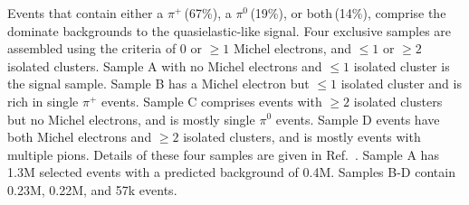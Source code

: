 \documentclass[aps,prl,twocolumn,showpacs,superscriptaddress, floatfix]{revtex4-2}  %
\begin{document}
Events that contain either a $\pi^+$\,(67\%), a $\pi^0$\,(19\%), or both\,(14\%), comprise the dominate backgrounds to the quasielastic-like signal.  Four exclusive samples are assembled using the criteria of $0$ or $\ge 1$ Michel electrons, and $\le 1$ or $\ge 2$ isolated clusters. 
 Sample A with no Michel electrons and $\le 1$ isolated cluster is the signal sample.
Sample B has a Michel electron but $\le 1$ isolated cluster and is rich in single $\pi^+$ events.  Sample C comprises events with $\ge2$ isolated clusters but no Michel electrons, and is mostly single $\pi^0$ events. Sample D events have both Michel electrons and $\ge2$ isolated clusters, and is mostly events with multiple pions.
Details of these four samples are given in Ref.~\cite{MINERvA:2018hqn}.
Sample A has 1.3M selected events with a predicted background of 0.4M.  Samples B-D contain 0.23M, 0.22M, and 57k events.
\end{document}
